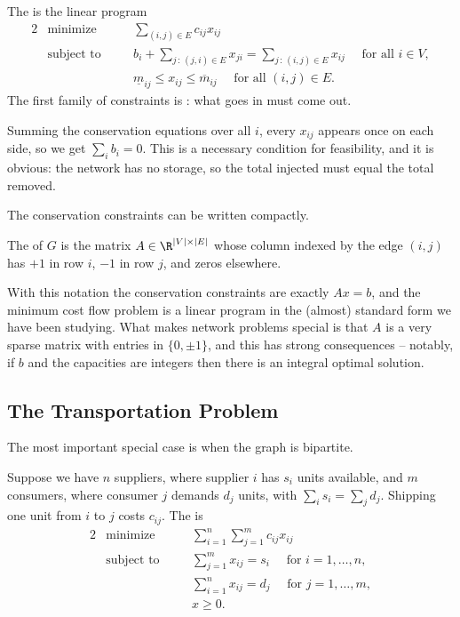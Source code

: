 \begin{definition}
    The  is the linear program
    \begin{alignat*}{2}
        & \text{minimize} \quad && \sum_{(i,j) \in E}c_{ij}x_{ij} \\
        & \text{subject to} \quad && b_i + \sum_{j\,:\,(j,i)\in E}x_{ji} = \sum_{j\,:\,(i,j)\in E}x_{ij} \quad \text{ for all } i \in V,\\
        & && \underline m_{ij} \leq x_{ij} \leq \overline m_{ij} \quad \text{ for all } (i,j) \in E.
    \end{alignat*}
    The first family of constraints is : what goes in must come out.
\end{definition}

Summing the conservation equations over all $i$, every $x_{ij}$ appears once on each side, so we get $\sum_i b_i = 0$. This is a necessary condition for feasibility, and it is obvious: the network has no storage, so the total injected must equal the total removed.

The conservation constraints can be written compactly.

\begin{definition}
    The  of $G$ is the matrix $A \in \R^{|V|\times|E|}$ whose column indexed by the edge $(i,j)$ has $+1$ in row $i$, $-1$ in row $j$, and zeros elsewhere.
\end{definition}

With this notation the conservation constraints are exactly $Ax = b$, and the minimum cost flow problem is a linear program in the (almost) standard form we have been studying. What makes network problems special is that $A$ is a very sparse matrix with entries in $\{0, \pm 1\}$, and this has strong consequences -- notably, if $b$ and the capacities are integers then there is an integral optimal solution.

\subsection{The Transportation Problem}

The most important special case is when the graph is bipartite.

\begin{definition}
    Suppose we have $n$ suppliers, where supplier $i$ has $s_i$ units available, and $m$ consumers, where consumer $j$ demands $d_j$ units, with $\sum_i s_i = \sum_j d_j$. Shipping one unit from $i$ to $j$ costs $c_{ij}$. The  is
    \begin{alignat*}{2}
        & \text{minimize} \quad && \sum_{i=1}^n\sum_{j=1}^m c_{ij}x_{ij} \\
        & \text{subject to} \quad && \sum_{j=1}^m x_{ij} = s_i \quad\text{ for } i = 1, \dots, n,\\
        & && \sum_{i=1}^n x_{ij} = d_j \quad\text{ for } j = 1, \dots, m,\\
        & && x \geq 0.
    \end{alignat*}
\end{definition}

